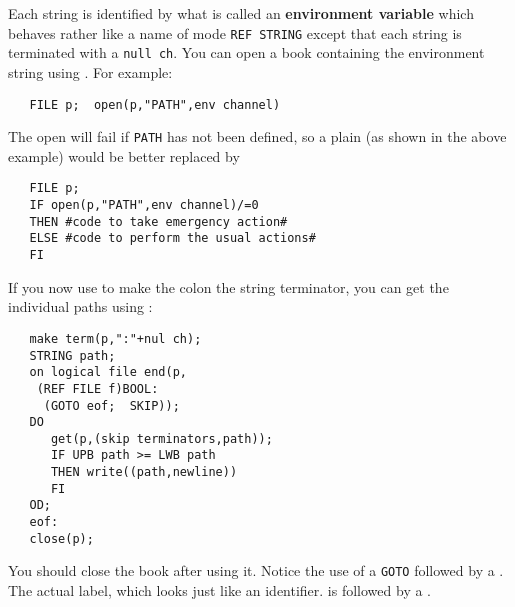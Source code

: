 Each string is identified by what is called an \textbf{environment
variable} which behaves rather like a name of mode \verb|REF STRING|
except that each string is terminated with a \verb|null ch|.
You can open a book containing the environment string using
. For example:
\begin{verbatim}
   FILE p;  open(p,"PATH",env channel)
\end{verbatim}
\noindent
The open will fail if \verb|PATH| has not been defined, so
a plain  (as shown in the above example)
would be better replaced by
\begin{verbatim}
   FILE p;
   IF open(p,"PATH",env channel)/=0
   THEN #code to take emergency action#
   ELSE #code to perform the usual actions#
   FI
\end{verbatim}
\noindent
If you now use  to make the
colon \ixtt{:} the string terminator, you can get the
individual paths using :
\begin{verbatim}
   make term(p,":"+nul ch);
   STRING path;
   on logical file end(p,
    (REF FILE f)BOOL:
     (GOTO eof;  SKIP));
   DO
      get(p,(skip terminators,path));
      IF UPB path >= LWB path
      THEN write((path,newline))
      FI
   OD;
   eof:
   close(p);
\end{verbatim}
\noindent
You should close the book after using it. Notice the use of a
\verb|GOTO| followed by a .  The actual label, which looks
just like an identifier. is followed by a .

